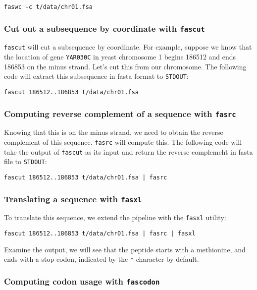 \documentclass[11pt]{article}
\begin{document}
\begin{verbatim}
faswc -c t/data/chr01.fsa
\end{verbatim}
\subsubsection{Cut out a subsequence by coordinate with \texttt{fascut}}
\label{sec-2_2_2}


\texttt{fascut} will cut a subsequence by coordinate. For example, suppose we
know that the location of gene \texttt{YAR030C} in yeast chromosome 1 begins
186512 and ends 186853 on the minus strand. Let's cut this from our
chromosome. The following code will extract this subsequence in fasta
format to \texttt{STDOUT}:

\begin{verbatim}
fascut 186512..186853 t/data/chr01.fsa
\end{verbatim}
\subsubsection{Computing reverse complement of a sequence with \texttt{fasrc}}
\label{sec-2_2_3}


Knowing that this is on the minus strand, we need to obtain the
reverse complement of this sequence.  \texttt{fasrc} will compute this.  The
following code will take the output of \texttt{fascut} as its input and
return the reverse complemeht in fasta file to \texttt{STDOUT}:

\begin{verbatim}
fascut 186512..186853 t/data/chr01.fsa | fasrc
\end{verbatim}
\subsubsection{Translating a sequence with \texttt{fasxl}}
\label{sec-2_2_4}


To translate this sequence, we extend the pipeline with the \texttt{fasxl} utility:

\begin{verbatim}
fascut 186512..186853 t/data/chr01.fsa | fasrc | fasxl
\end{verbatim}

Examine the output, we will see that the peptide starts with a
methionine, and ends with a stop codon, indicated by the \texttt{*} character
by default. 
\subsubsection{Computing codon usage with \texttt{fascodon}}
\label{sec-2_2_5}
\end{document}
